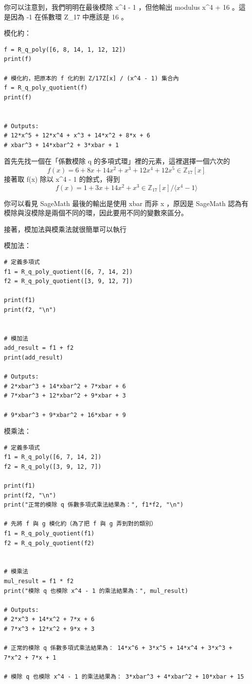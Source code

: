 \documentclass[
]{article}
\begin{document}
你可以注意到，我們明明在最後模除 x\^{}4 - 1 ，但他輸出 modulus x\^{}4 +
16 。這是因為 -1 在係數環 Z\_17 中應該是 16 。

模化約：

\begin{verbatim}
f = R_q_poly([6, 8, 14, 1, 12, 12])
print(f)

# 模化約，把原本的 f 化約到 Z/17Z[x] / (x^4 - 1) 集合內
f = R_q_poly_quotient(f)
print(f)


# Outputs:
# 12*x^5 + 12*x^4 + x^3 + 14*x^2 + 8*x + 6
# xbar^3 + 14*xbar^2 + 3*xbar + 1
\end{verbatim}

首先先找一個在「係數模除 q 的多項式環」裡的元素，這裡選擇一個六次的 \[
f(x) = 6 + 8x + 14x^{2} + x^{3} +  12x^{4} + 12x^{5} \in \mathbb{Z}_{17}[x]
\] 接著取 f(x) 除以 x\^{}4 - 1 的餘式，得到 \[
f(x) = 1 + 3x+14x^{2} + x^{3} \in \mathbb{Z}_{17} [x] / \langle x^4 - 1\rangle
\]

你可以看見 SageMath 最後的輸出是使用 xbar 而非 x ，原因是 SageMath
認為有模除與沒模除是兩個不同的環，因此要用不同的變數來區分。

接著，模加法與模乘法就很簡單可以執行

模加法：

\begin{verbatim}
# 定義多項式
f1 = R_q_poly_quotient([6, 7, 14, 2])
f2 = R_q_poly_quotient([3, 9, 12, 7])

print(f1)
print(f2, "\n")


# 模加法
add_result = f1 + f2
print(add_result)

# Outputs:
# 2*xbar^3 + 14*xbar^2 + 7*xbar + 6
# 7*xbar^3 + 12*xbar^2 + 9*xbar + 3 

# 9*xbar^3 + 9*xbar^2 + 16*xbar + 9
\end{verbatim}

模乘法：

\begin{verbatim}
# 定義多項式
f1 = R_q_poly([6, 7, 14, 2])
f2 = R_q_poly([3, 9, 12, 7])

print(f1)
print(f2, "\n")
print("正常的模除 q 係數多項式乘法結果為：", f1*f2, "\n")

# 先將 f 與 g 模化約（為了把 f 與 g 弄到對的類別）
f1 = R_q_poly_quotient(f1)
f2 = R_q_poly_quotient(f2)


# 模乘法
mul_result = f1 * f2
print("模除 q 也模除 x^4 - 1 的乘法結果為：", mul_result)

# Outputs:
# 2*x^3 + 14*x^2 + 7*x + 6
# 7*x^3 + 12*x^2 + 9*x + 3 

# 正常的模除 q 係數多項式乘法結果為： 14*x^6 + 3*x^5 + 14*x^4 + 3*x^3 + 7*x^2 + 7*x + 1 

# 模除 q 也模除 x^4 - 1 的乘法結果為： 3*xbar^3 + 4*xbar^2 + 10*xbar + 15
\end{verbatim}
\end{document}
